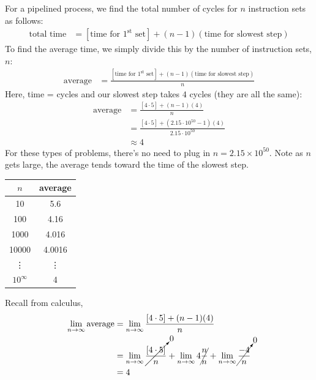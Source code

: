 \documentclass{exam}
\begin{document}
\begin{questions}
		\begin{solution}
		    For a pipelined process, we find the total number of cycles for $n$ instruction sets as follows:
    		    \begin{align}
    		        \text{total time} &= [\text{time for $1^{\text{st}}$ set}]+(n-1)(\text{time for slowest step})
    		    \end{align}
		    To find the average time, we simply divide this by the number of instruction sets, $n$:
    		    \begin{align}
    		        \text{average} &= \frac{[\text{time for $1^{\text{st}}$ set}]+(n-1)(\text{time for slowest step})}{n}
    		    \end{align}
		    Here, time = cycles and our slowest step takes $4$ cycles (they are all the same): 
    		    \begin{align}
    		        \text{average} &= \frac{[4\cdot 5]+(n-1)(4)}{n}\\
    		                       &= \frac{[4\cdot 5]+(2.15\cdot 10^{50}-1)(4)}{2.15\cdot 10^{50}}\\
    		                       &\approx 4
    		    \end{align}
    		For these types of problems, there's no need to plug in $n=2.15\times 10^{50}$. Note as $n$ gets large, the average tends toward the time of the slowest step.\\
            \begin{center}
            \hspace{20pt}\begin{tabular}{ c|c } 
                 $n$ & average \\ 
                 \hline
                 10 & 5.6 \\ 
                 100 & 4.16 \\ 
                 1000 & 4.016 \\ 
                 10000 & 4.0016 \\ 
                 \vdots & \vdots \\ 
                 $10^{\infty}$ & 4 \\ 
            \end{tabular}
            \end{center}
            Recall from calculus,
            \begin{align}
    		        \lim_{n\rightarrow\infty}\text{average}
    		        &=\lim_{n\rightarrow\infty} \frac{[4\cdot 5]+(n-1)(4)}{n}\\
    		        &=\lim_{n\rightarrow\infty}\cancelto{0}{\frac{[4\cdot 5]}{n}}
    		        +\lim_{n\rightarrow\infty}4\cancel{\frac{n}{n}}
    		        +\lim_{n\rightarrow\infty}\cancelto{0}{\frac{-4}{n}}\\
    		        &= 4
    		    \end{align}
    		
		\end{solution}

\end{questions}
\end{document}
